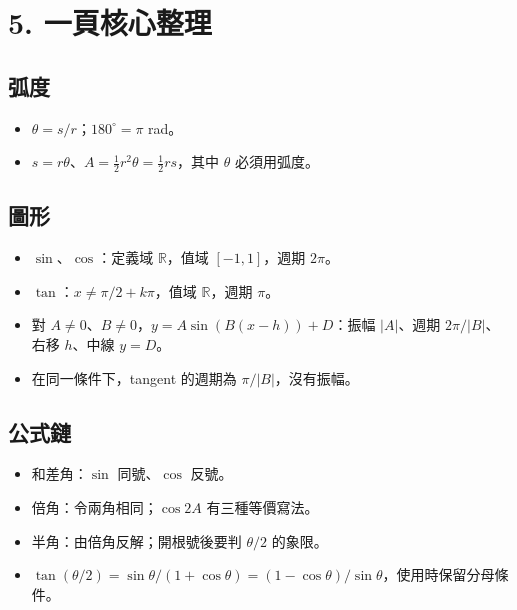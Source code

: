 \documentclass[11pt,a4paper]{article}
\providecommand{\tightlist}{%
  \setlength{\itemsep}{0pt}\setlength{\parskip}{0pt}}
\begin{document}
\section{5. 一頁核心整理}\label{ux4e00ux9801ux6838ux5fc3ux6574ux7406}

\subsection{弧度}\label{ux5f27ux5ea6}

\begin{itemize}
\tightlist
\item
  \(\theta=s/r\)；\(180^\circ=\pi\) rad。
\item
  \(s=r\theta\)、\(A=\tfrac12r^2\theta=\tfrac12rs\)，其中 \(\theta\) 必須用弧度。
\end{itemize}

\subsection{圖形}\label{ux5716ux5f62}

\begin{itemize}
\tightlist
\item
  \(\sin\)、\(\cos\)：定義域 \(\mathbb R\)，值域 \([-1,1]\)，週期 \(2\pi\)。
\item
  \(\tan\)：\(x\ne\pi/2+k\pi\)，值域 \(\mathbb R\)，週期 \(\pi\)。
\item
  對 \(A\ne0\)、\(B\ne0\)，\(y=A\sin(B(x-h))+D\)：振幅 \(|A|\)、週期 \(2\pi/|B|\)、右移 \(h\)、中線 \(y=D\)。
\item
  在同一條件下，tangent 的週期為 \(\pi/|B|\)，沒有振幅。
\end{itemize}

\subsection{公式鏈}\label{ux516cux5f0fux93c8}

\begin{itemize}
\tightlist
\item
  和差角：\(\sin\) 同號、\(\cos\) 反號。
\item
  倍角：令兩角相同；\(\cos2A\) 有三種等價寫法。
\item
  半角：由倍角反解；開根號後要判 \(\theta/2\) 的象限。
\item
  \(\tan(\theta/2)=\sin\theta/(1+\cos\theta)=(1-\cos\theta)/\sin\theta\)，使用時保留分母條件。
\end{itemize}
\end{document}
